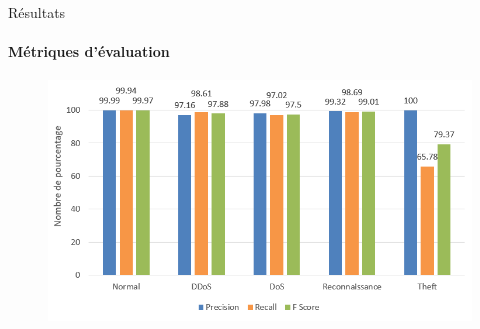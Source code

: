 \documentclass[aspectratio=169,professionalfonts, 12pt]{beamer}
\begin{document}
\begin{frame}{Résultats}
	\framesubtitle{Métriques d'évaluation}
	\begin{minipage}{0.6\textwidth}
		\begin{figure}[t]
	       \centering
 \includegraphics[height=0.7\textheight]{images/resultat} 
	    \end{figure}
	\end{minipage}
	\hspace{1cm}
	\begin{minipage}{0.3\textwidth}
	\end{minipage}
\end{frame}
\end{document}
